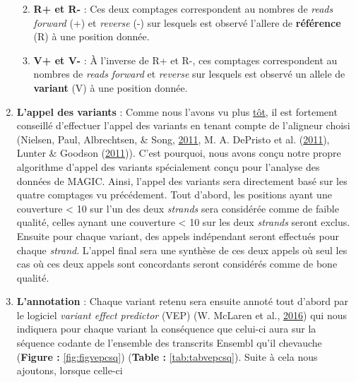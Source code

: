 \documentclass[12pt,twoside]{reedthesis}
\providecommand{\tightlist}{%
  \setlength{\itemsep}{0pt}\setlength{\parskip}{0pt}}
\theoremstyle{definition}
\theoremstyle{definition}
\theoremstyle{remark}
\begin{document}
\begin{enumerate}
    \begin{enumerate}
    \def\labelenumii{\alph{enumii}.}
    \tightlist
    \item
      \textbf{R+ et R-} : Ces deux comptages correspondent au nombres de
      \emph{reads} \emph{forward} (+) et \emph{reverse} (-) sur lesquels
      est observé l'allere de \textbf{référence} (R) à une position
      donnée.\\
    \item
      \textbf{V+ et V-} : À l'inverse de R+ et R-, ces comptages
      correspondent au nombres de \emph{reads} \emph{forward} et
      \emph{reverse} sur lesquels est observé un allele de
      \textbf{variant} (V) à une position donnée.\\
    \end{enumerate}
  \item
    \textbf{L'appel des variants} : Comme nous l'avons vu plus
    \protect\hyperlink{varcall}{tôt}, il est fortement conseillé
    d'effectuer l'appel des variants en tenant compte de l'aligneur choisi
    (Nielsen, Paul, Albrechtsen, \& Song,
    \protect\hyperlink{ref-Nielsen2011}{2011}, M. A. DePristo et al.
    (\protect\hyperlink{ref-DePristo2011}{2011}), Lunter \& Goodson
    (\protect\hyperlink{ref-Lunter2011}{2011})). C'est pourquoi, nous
    avons conçu notre propre algorithme d'appel des variants spécialement
    conçu pour l'analyse des données de MAGIC. Ainsi, l'appel des variants
    sera directement basé sur les quatre comptages vu précédement. Tout
    d'abord, les positions ayant une couverture \textless{} 10 sur l'un
    des deux \emph{strands} sera considérée comme de faible qualité,
    celles aynant une couverture \textless{} 10 sur les deux
    \emph{strands} seront exclus. Ensuite pour chaque variant, des appels
    indépendant seront effectués pour chaque \emph{strand}. L'appel final
    sera une synthèse de ces deux appels où seul les cas où ces deux
    appels sont concordants seront considérés comme de bone qualité.\\
  \item
    \textbf{L'annotation} : Chaque variant retenu sera ensuite annoté tout
    d'abord par le logiciel \emph{variant effect predictor} (VEP) (W.
    McLaren et al., \protect\hyperlink{ref-McLaren2016}{2016}) qui nous
    indiquera pour chaque variant la conséquence que celui-ci aura sur la
    séquence codante de l'ensemble des transcrits Ensembl qu'il chevauche
    (\textbf{Figure : }\ref{fig:figvepcsq}) (\textbf{Table :
    }\ref{tab:tabvepcsq}). Suite à cela nous ajoutons, lorsque celle-ci

\end{enumerate}
\end{document}
